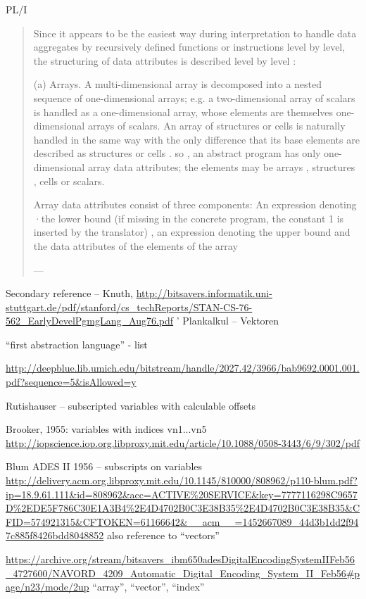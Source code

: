 PL/I
\begin{quote}
Since it appears to be the
easiest way during interpretation to handle data aggregates by recursively defined
functions or instructions level by level, the structuring of data attributes is
described level by level :

(a)
Arrays. A multi-dimensional array is decomposed into a nested sequence of
one-dimensional arrays; e.g. a two-dimensional array of scalars is handled
as a one-dimensional array, whose elements are themselves one-dimensional
arrays of scalars. An array of structures or cells is naturally handled in
the same way with the only difference that its base elements are described
as structures or cells . so , an abstract program has only one-dimensional
array data attributes; the elements may be arrays , structures , cells or
scalars.

Array data attributes consist of three components: An expression denoting
·the lower bound (if missing in the concrete program, the constant 1 is inserted
by the translator) , an expression denoting the upper bound and the
data attributes of the elements of the array

--- \cite[\S 2.3.1, pp. 2-8--9]{Lucas1968}
\end{quote}

Secondary reference – Knuth,
\url{http://bitsavers.informatik.uni-stuttgart.de/pdf/stanford/cs_techReports/STAN-CS-76-562_EarlyDevelPgmgLang_Aug76.pdf}
'
Plankalkul – Vektoren


“first abstraction language” - list

\url{http://deepblue.lib.umich.edu/bitstream/handle/2027.42/3966/bab9692.0001.001.pdf?sequence=5&isAllowed=y}

Rutishauser – subscripted variables with calculable offsets

Brooker, 1955: variables with indices vn1...vn5
\url{http://iopscience.iop.org.libproxy.mit.edu/article/10.1088/0508-3443/6/9/302/pdf}

Blum ADES II 1956 – subscripts on variables
\url{http://delivery.acm.org.libproxy.mit.edu/10.1145/810000/808962/p110-blum.pdf?ip=18.9.61.111&id=808962&acc=ACTIVE%20SERVICE&key=7777116298C9657D%2EDE5F786C30E1A3B4%2E4D4702B0C3E38B35%2E4D4702B0C3E38B35&CFID=574921315&CFTOKEN=61166642&__acm__=1452667089_44d3b1dd2f947c885f8426bdd8048852}
also reference to “vectors”

\url{https://archive.org/stream/bitsavers_ibm650adesDigitalEncodingSystemIIFeb56_4727600/NAVORD_4209_Automatic_Digital_Encoding_System_II_Feb56#page/n23/mode/2up}
“array”, “vector”, “index”

